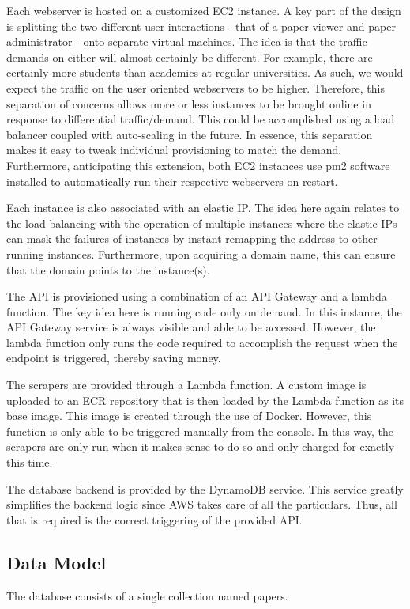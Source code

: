 \documentclass[12pt]{article}
\begin{document}
Each webserver is hosted on a customized EC2 instance. A key part of the design is splitting the two different user interactions - that of a paper viewer and paper administrator - onto separate virtual machines. The idea is that the traffic demands on either will almost certainly be different. For example, there are certainly more students than academics at regular universities. As such, we would expect the traffic on the user oriented webservers to be higher. Therefore, this separation of concerns allows more or less instances to be brought online in response to differential traffic/demand. This could be accomplished using a load balancer coupled with auto-scaling in the future. In essence, this separation makes it easy to tweak individual provisioning to match the demand. 
Furthermore, anticipating this extension, both EC2 instances use pm2 software installed to automatically run their respective webservers on restart. 

Each instance is also associated with an elastic IP. The idea here again relates to the load balancing with the operation of multiple instances where the elastic IPs can mask the failures of instances by instant remapping the address to other running instances. Furthermore, upon acquiring a domain name, this can ensure that the domain points to the instance(s).

The API is provisioned using a combination of an API Gateway and a lambda function. The key idea here is running code only on demand. In this instance, the API Gateway service is always visible and able to be accessed. However, the lambda function only runs the code required to accomplish the request when the endpoint is triggered, thereby saving money.   

The scrapers are provided through a Lambda function. A custom image is uploaded to an ECR repository that is then loaded by the Lambda function as its base image. This image is created through the use of Docker. However, this function is only able to be triggered manually from the console. In this way, the scrapers are only run when it makes sense to do so and only charged for exactly this time.

The database backend is provided by the DynamoDB service. This service greatly simplifies the backend logic since AWS takes care of all the particulars. Thus, all that is required is the correct triggering of the provided API. 

\subsection{Data Model}
The database consists of a single collection named papers.
\end{document}
